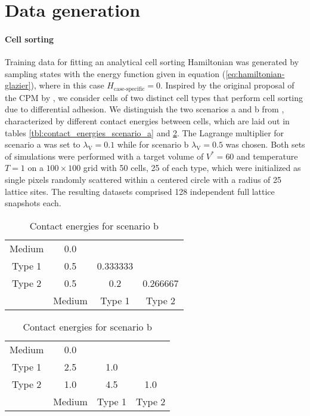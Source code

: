 \section{Data generation}\label{sec:app-data-gen}

\paragraph{Cell sorting}
Training data for fitting an analytical cell sorting Hamiltonian was generated by sampling states with the energy function given in equation (\ref{eq:hamiltonian-glazier}), where in this case $H_\text{case-specific} = 0$. Inspired by the original proposal of the CPM by \citet{Graner1992}, we consider cells of two distinct cell types that perform cell sorting due to differential adhesion. We distinguish the two scenarios a and b from \citet{edelstein2023simplecellsort}, characterized by different contact energies between cells, which are laid out in tables \ref{tbl:contact_energies_scenario_a} and \ref{tbl:contact_energies_scenario_b}. The Lagrange multiplier for scenario a was set to $\lambda_\mathrm{V} = 0.1$ while for scenario b $\lambda_\mathrm{V} = 0.5$ was chosen. Both sets of simulations were performed with a target volume of $V^* = 60$ and temperature $T=1$ on a $100 \times 100$ grid with 50 cells, 25 of each type, which were initialized as single pixels randomly scattered within a centered circle with a radius of 25 lattice sites. The resulting datasets comprised 128 independent full lattice snapshots each. 

\begin{table}[h]
\begin{minipage}{0.5\linewidth}
\centering
\caption{Contact energies for scenario a}
\vskip 0.15in
\label{tbl:contact_energies_scenario_a}

\begin{tabular}{|*{4}{c|}}
    \cline{1-2}
    Medium & 0.0 \\ \cline{1-3}
    Type 1 & 0.5 & 0.333333 \\ \hline
    Type 2 & 0.5 & 0.2 & 0.266667 \\ \hline
           & Medium & Type 1 & Type 2 \\ \hline
\end{tabular}
\end{minipage}
\begin{minipage}{.5\linewidth}
\centering
\caption{Contact energies for scenario b}
\vskip 0.15in
\label{tbl:contact_energies_scenario_b}

\begin{tabular}{|*{4}{c|}}
    \cline{1-2}
    Medium & 0.0 \\ \cline{1-3}
    Type 1 & 2.5 & 1.0 \\ \hline
    Type 2 & 1.0 & 4.5 & 1.0 \\ \hline
           & Medium & Type 1 & Type 2 \\ \hline
\end{tabular}
\end{minipage}
\end{table}

